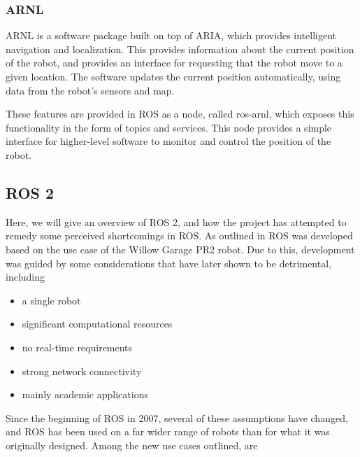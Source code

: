 \documentclass[\rootfolder/main.tex]{subfiles}
\begin{document}
\subsubsection{ARNL}

ARNL is a software package built on top of ARIA, which provides intelligent navigation and localization.
This provides information about the current position of the robot, and provides an interface for requesting that the robot move to a given location.
The software updates the current position automatically, using data from the robot's sensors and map.

These features are provided in ROS as a node, called ros-arnl, which exposes this functionality in the form of topics and services.
This node provides a simple interface for higher-level software to monitor and control the position of the robot.


\subsection{ROS 2}

Here, we will give an overview of ROS 2, and how the project has attempted to remedy some perceived shortcomings in ROS.
As outlined in \cite{Gerkey2017} ROS was developed based on the use case of the Willow Garage PR2 robot.
Due to this, development was guided by some considerations that have later shown to be detrimental, including

\begin{itemize}
    \item a single robot
    \item significant computational resources
    \item no real-time requirements
    \item strong network connectivity
    \item mainly academic applications
\end{itemize}

Since the beginning of ROS in 2007, several of these assumptions have changed, and ROS has been used on a far wider range of robots than for what it was originally designed.
Among the new use cases outlined, are
\end{document}
